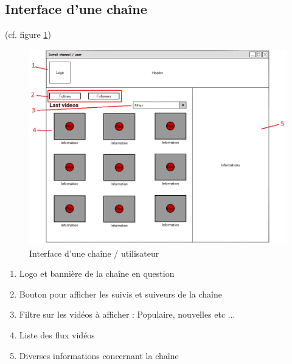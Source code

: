 \documentclass[11pt]{report} %
\begin{document}
		\subsection{Interface d'une chaîne}
		(cf. figure \ref{interfacechannel})
		\begin{figure}[h]
			\center
			\includegraphics[width=1\textwidth]{../img/channelInterfacenum.png}
			\caption{Interface d'une chaîne / utilisateur}
			\label{interfacechannel}
		\end{figure}
		
		\begin{enumerate}
			\item Logo et bannière de la chaîne en question
			\item Bouton pour afficher les suivis et suiveurs de la chaîne
			\item Filtre sur les vidéos à afficher : Populaire, nouvelles etc ...
			\item Liste des flux vidéos
			\item Diverses informations concernant la chaîne
		\end{enumerate}
		\newpage
\end{document}
